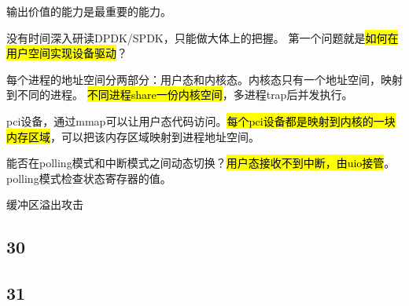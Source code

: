 输出价值的能力是最重要的能力。

没有时间深入研读DPDK/SPDK，只能做大体上的把握。
第一个问题就是\hl{如何在用户空间实现设备驱动}？

每个进程的地址空间分两部分：用户态和内核态。内核态只有一个地址空间，映射到不同的进程。
\hl{不同进程share一份内核空间}，多进程trap后并发执行。

pci设备，通过mmap可以让用户态代码访问。\hl{每个pci设备都是映射到内核的一块内存区域}，可以把该内存区域映射到进程地址空间。

能否在polling模式和中断模式之间动态切换？\hl{用户态接收不到中断，由uio接管}。polling模式检查状态寄存器的值。

缓冲区溢出攻击

\subsection{30}

\subsection{31}
